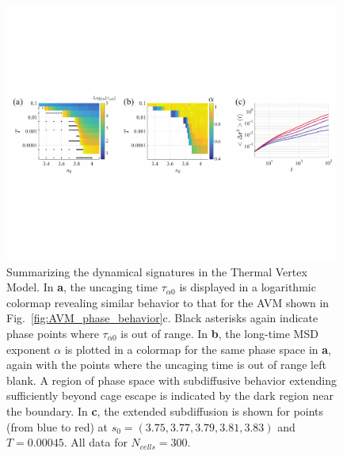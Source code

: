 \documentclass[
reprint
,aps
,amssymb
,amsmath
,superscriptaddress
]{revtex4-1}
\begin{document}
\begin{figure}[!t]  
\begin{center}
    \includegraphics[width=0.98\textwidth]{manuscript_images_app_avm_thermal.pdf}
    \caption{\label{fig:app_avm_thermal} Summarizing the dynamical signatures in the Thermal Vertex Model. In \textbf{a}, the uncaging time $\tau_{\alpha0}$ is displayed in a logarithmic colormap revealing similar behavior to that for the AVM shown in Fig.~\ref{fig:AVM_phase_behavior}c. Black asterisks again indicate phase points where $\tau_{\alpha0}$ is out of range. In \textbf{b}, the long-time MSD exponent $\alpha$ is plotted in a colormap for the same phase space in \textbf{a}, again with the points where the uncaging time is out of range left blank. A region of phase space with subdiffusive behavior extending sufficiently beyond cage escape is indicated by the dark region near the boundary. In \textbf{c}, the extended subdiffusion is shown for points (from blue to red) at $s_0 = (3.75, 3.77, 3.79, 3.81, 3.83)$ and $T=0.00045$. All data for $N_{cells} = 300$. }
    \end{center}
  \end{figure}
\end{document}
